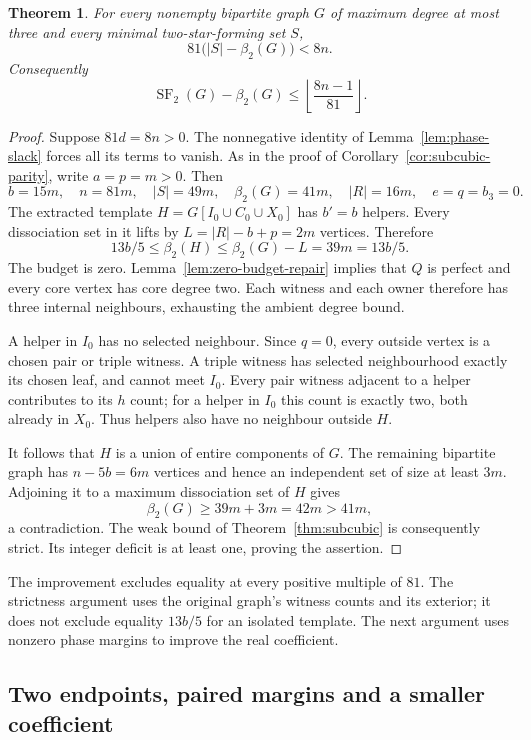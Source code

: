 \documentclass[11pt]{article}
\newtheorem{theorem}{Theorem}
\newcommand{\SF}{\operatorname{SF}_2}
\newcommand{\diss}{\beta_2}
\begin{document}
\begin{theorem}\label{thm:strict-subcubic}
For every nonempty bipartite graph $G$ of maximum degree at most three
and every minimal two-star-forming set $S$,
\[
 81\bigl(|S|-\diss(G)\bigr)<8n.
\]
Consequently
\[
 \boxed{\SF(G)-\diss(G)\le
          \left\lfloor\frac{8n-1}{81}\right\rfloor.}
\]
\end{theorem}
\begin{proof}
Suppose $81d=8n>0$. The nonnegative identity of
Lemma~\ref{lem:phase-slack} forces all its terms to vanish.
As in the proof of Corollary~\ref{cor:subcubic-parity}, write $a=p=m>0$.
Then
\[
 b=15m,\quad n=81m,\quad |S|=49m,\quad
 \diss(G)=41m,\quad |R|=16m,\quad e=q=b_3=0.
\]
The extracted template $H=G[I_0\cup C_0\cup X_0]$ has $b'=b$ helpers.
Every dissociation set in it lifts by
$L=|R|-b+p=2m$ vertices. Therefore
\[
 13b/5\le\diss(H)\le\diss(G)-L=39m=13b/5.
\]
The budget is zero. Lemma~\ref{lem:zero-budget-repair} implies that
$Q$ is perfect and every core vertex has core degree two.
Each witness and each owner therefore has three internal neighbours,
exhausting the ambient degree bound.

A helper in $I_0$ has no selected neighbour. Since $q=0$, every outside
vertex is a chosen pair or triple witness. A triple witness has
selected neighbourhood exactly its chosen leaf, and cannot meet $I_0$.
Every pair witness adjacent to a helper contributes to its $h$ count;
for a helper in $I_0$ this count is exactly two, both already in $X_0$.
Thus helpers also have no neighbour outside $H$.

It follows that $H$ is a union of entire components of $G$.
The remaining bipartite graph has $n-5b=6m$ vertices and hence an
independent set of size at least $3m$. Adjoining it to a maximum
dissociation set of $H$ gives
\[
 \diss(G)\ge39m+3m=42m>41m,
\]
a contradiction. The weak bound of Theorem~\ref{thm:subcubic}
is consequently strict. Its integer deficit is at least one,
proving the assertion.
\end{proof}

The improvement excludes equality at every positive multiple of $81$.
The strictness argument uses the original graph's witness counts and its
exterior; it does not exclude equality $13b/5$ for an isolated template.
The next argument uses nonzero phase margins to improve the real coefficient.

\subsection{Two endpoints, paired margins and a smaller coefficient}
\end{document}

